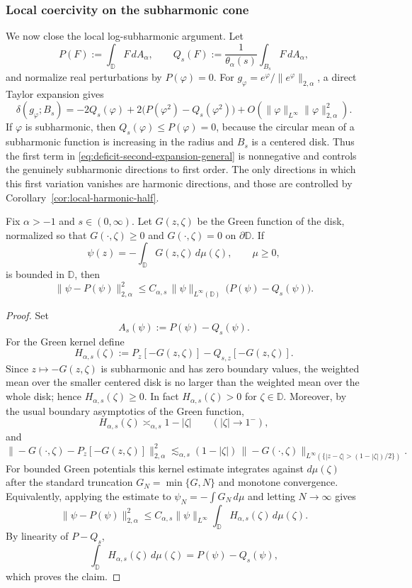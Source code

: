 \documentclass[a4paper,10pt]{amsart}
\newcommand{\D}{\mathbb{D}}
\begin{document}
\subsubsection*{Local coercivity on the subharmonic cone}

We now close the local log-subharmonic argument. Let
\[
P(F):=\int_\D F\,dA_\alpha,\qquad
Q_s(F):=\frac1{\theta_\alpha(s)}\int_{B_s}F\,dA_\alpha,
\]
and normalize real perturbations by $P(\varphi)=0$. For
$g_\varphi=e^\varphi/\|e^\varphi\|_{2,\alpha}$, a direct Taylor expansion gives
\begin{equation}\label{eq:deficit-second-expansion-general}
\delta(g_\varphi;B_s)
=
-2Q_s(\varphi)
+2\bigl(P(\varphi^2)-Q_s(\varphi^2)\bigr)
+O(\|\varphi\|_{L^\infty}\|\varphi\|_{2,\alpha}^2).
\end{equation}
If $\varphi$ is subharmonic, then $Q_s(\varphi)\le P(\varphi)=0$, because the
circular mean of a subharmonic function is increasing in the radius and
$B_s$ is a centered disk. Thus the first term in
\eqref{eq:deficit-second-expansion-general} is nonnegative and controls the
genuinely subharmonic directions to first order. The only directions in which
this first variation vanishes are harmonic directions, and those are controlled
by Corollary~\ref{cor:local-harmonic-half}.

\begin{numlemma}\label{lem:green-potential-coercivity}
Fix $\alpha>-1$ and $s\in(0,\infty)$. Let $G(z,\zeta)$ be the Green function of
the disk, normalized so that $G(\cdot,\zeta)\ge0$ and $G(\cdot,\zeta)=0$ on
$\partial\D$. If
\[
\psi(z)=-\int_\D G(z,\zeta)\,d\mu(\zeta),
\qquad \mu\ge0,
\]
is bounded in $\D$, then
\[
\|\psi-P(\psi)\|_{2,\alpha}^2
\le
C_{\alpha,s}\,\|\psi\|_{L^\infty(\D)}\,
\bigl(P(\psi)-Q_s(\psi)\bigr).
\]
\end{numlemma}

\begin{proof}
Set
\[
A_s(\psi):=P(\psi)-Q_s(\psi).
\]
For the Green kernel define
\[
H_{\alpha,s}(\zeta):=
P_z[-G(z,\zeta)]-Q_{s,z}[-G(z,\zeta)].
\]
Since $z\mapsto -G(z,\zeta)$ is subharmonic and has zero boundary values,
the weighted mean over the smaller centered disk is no larger than the weighted
mean over the whole disk; hence $H_{\alpha,s}(\zeta)\ge0$. In fact
$H_{\alpha,s}(\zeta)>0$ for $\zeta\in\D$. Moreover, by the usual boundary
asymptotics of the Green function,
\[
H_{\alpha,s}(\zeta)\asymp_{\alpha,s} 1-|\zeta|
\qquad (|\zeta|\to1^-),
\]
and
\[
\|-G(\cdot,\zeta)-P_z[-G(z,\zeta)]\|_{2,\alpha}^2
\lesssim_{\alpha,s}
(1-|\zeta|)\,\|-G(\cdot,\zeta)\|_{L^\infty(\{|z-\zeta|> (1-|\zeta|)/2\})}.
\]
For bounded Green potentials this kernel estimate integrates against
$d\mu(\zeta)$ after the standard truncation
$G_N=\min\{G,N\}$ and monotone convergence. Equivalently, applying the estimate
to $\psi_N=-\int G_N\,d\mu$ and letting $N\to\infty$ gives
\[
\|\psi-P(\psi)\|_{2,\alpha}^2
\le
C_{\alpha,s}\|\psi\|_{L^\infty}
\int_\D H_{\alpha,s}(\zeta)\,d\mu(\zeta).
\]
By linearity of $P-Q_s$,
\[
\int_\D H_{\alpha,s}(\zeta)\,d\mu(\zeta)
=
P(\psi)-Q_s(\psi),
\]
which proves the claim.
\end{proof}
\end{document}
